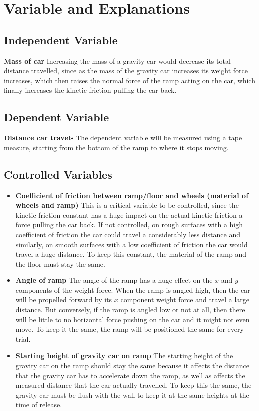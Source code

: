 \documentclass[12pt]{article}
\begin{document}
\section{Variable and Explanations}

\subsection{Independent Variable} \textbf{Mass of car} Increasing the mass of a gravity car would decrease its total distance travelled, since as the mass of the gravity car increases its weight force increases, which then raises the normal force of the ramp acting on the car, which finally increases the kinetic friction pulling the car back.

\subsection{Dependent Variable} \textbf{Distance car travels} The dependent variable will be measured using a tape measure, starting from the bottom of the ramp to where it stops moving.

\subsection{Controlled Variables}
\begin{itemize}
	\item \textbf{Coefficient of friction between ramp/floor and wheels (material of wheels and ramp)} This is a critical variable to be controlled, since the kinetic friction constant has a huge impact on the actual kinetic friction a force pulling the car back. If not controlled, on rough surfaces with a high coefficient of friction the car could travel a considerably less distance and similarly, on smooth surfaces with a low coefficient of friction the car would travel a huge distance. To keep this constant, the material of the ramp and the floor must stay the same.
	\item \textbf{Angle of ramp} The angle of the ramp has a huge effect on the \(x\) and \(y\) components of the weight force. When the ramp is angled high, then the car will be propelled forward by its \(x\) component weight force and travel a large distance. But conversely, if the ramp is angled low or not at all, then there will be little to no horizontal force pushing on the car and it might not even move. To keep it the same, the ramp will be positioned the same for every trial.
	\item \textbf{Starting height of gravity car on ramp} The starting height of the gravity car on the ramp should stay the same because it affects the distance that the gravity car has to accelerate down the ramp, as well as affects the measured distance that the car actually travelled. To keep this the same, the gravity car must be flush with the wall to keep it at the same heights at the time of release.
\end{itemize}
\end{document}
